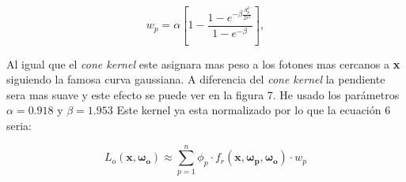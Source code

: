 \documentclass{article}
\begin{document}
\begin{equation}
w_p = \alpha \left[1 - \frac{1 - e^{-\beta\frac{d_p^2}{2r^2}}}{1 - e^{-\beta}} \right] ,
\end{equation}

Al igual que el \textit{cone kernel} este asignara mas peso a los fotones mas cercanos a \textbf{x} siguiendo la famosa curva gaussiana. A diferencia del  \textit{cone kernel} la pendiente sera mas suave y este efecto se puede ver en la figura 7.
He usado los parámetros \(\alpha = 0.918\) y \(\beta = 1.953 \) \cite{HenrikCourse8}
Este kernel ya esta normalizado por lo que la ecuación 6 seria:

\begin{equation}
L_o(\mathbf{x}, \mathbf{\omega_{o}}) \approx \sum_{p=1}^{n} \phi_{p} \cdot f_r(\mathbf{x}, \mathbf{\omega_{p}}, \mathbf{\omega_{o}}) \cdot w_p
\end{equation}


\medskip

\printbibliography
\end{document}
